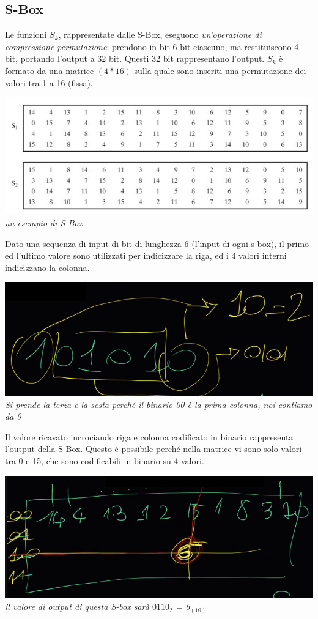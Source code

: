\documentclass[11pt, oneside]{article}   	%
\begin{document}
\subsection*{S-Box}
Le funzioni $S_k$, rappresentate dalle S-Box, eseguono \emph{un'operazione di compressione-permutazione}: prendono in bit 6 bit ciascuno, ma restituiscono 4 bit, portando l'output a 32 bit. Questi 32 bit rappresentano l'output. $S_k$ è formato da una matrice $(4 * 16)$ sulla quale sono inseriti una permutazione dei valori tra 1 a 16 (fissa).
\begin{center}
\includegraphics[scale= 0.7]{sbox}\\
\emph{un esempio di S-Box}
\end{center}
Dato una sequenza di input di bit di lunghezza 6 (l'input di ogni s-box), il primo ed l'ultimo valore sono utilizzati per indicizzare la riga, ed i 4 valori interni indicizzano la colonna.
\begin{center}
\includegraphics[scale= 0.5]{sbox1}\\
\emph{Si prende la terza e la sesta perché il binario 00 è la prima colonna, noi contiamo da 0}
\end{center}
Il valore ricavato incrociando riga e colonna codificato in binario rappresenta l'output della S-Box.
Questo è possibile perché nella matrice vi sono solo valori tra 0 e 15, che sono codificabili in binario su 4 valori.
\begin{center}
\includegraphics[scale= 0.5]{sbox2}\\
\emph{il valore di output di questa S-box sarà $0110_2$ = 6$_{(10)}$}
\end{center}
\end{document}
